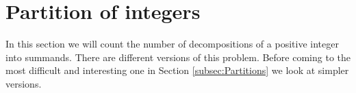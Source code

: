 

\setcounter{section}{3}
\setcounter{subsection}{1}
\setcounter{dfn}{0}

\section{Partition of integers}
In this section we will count the number of decompositions of a positive integer into summands.
There are different versions of this problem.
Before coming to the most difficult and interesting one in Section \ref{subsec:Partitions} we look at simpler versions.




